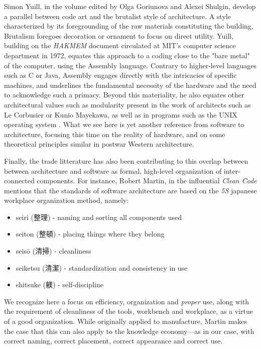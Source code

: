 Simon Yuill, in the volume edited by Olga Goriunova and Alexei Shulgin, develop a parallel between code art and the brutalist style of architecture. A style characterized by its foregrounding of the raw materials constituting the building, Brutalism foregoes decoration or ornament to focus on direct utility. Yuill, building on the \emph{HAKMEM} document circulated at MIT's computer science department in 1972, equates this approach to a coding close to the "bare metal" of the computer, using the Assembly language. Contrary to higher-level languages such as C or Java, Assembly engages directly with the intricacies of specific machines, and underlines the fundamental necessity of the hardware and the need to acknowledge such a primacy. Beyond this materiality, he also equates other architectural values such as modularity present in the work of architects such as Le Corbusier or Kunio Mayekawa, as well as in programs such as the UNIX operating system \citep{yuill_code_2004}. What we see here is yet another reference from software to architecture, focusing this time on the reality of hardware, and on some theoretical principles similar in postwar Western architecture.

Finally, the trade litterature has also been contributing to this overlap between between architecture and software as formal, high-level organization of inter-connected components. For instance, Robert Martin, in the influential \emph{Clean Code} mentions that the standards of software architecture are based on the \emph{5S} japanese workplace organization method, namely:

\begin{itemize}
  \item seiri (整理) - naming and sorting all components used
  \item seiton (整頓) - placing things where they belong
  \item seisō (清掃) - cleanliness
  \item seiketsu (清潔) - standardization and consistency in use
  \item shitsuke (躾) - self-discipline
\end{itemize}

We recognize here a focus on efficiency, organization and \emph{proper} use, along with the requirement of cleanliness of the tools, workbench and workplace, as a virtue of a good organization. While originally applied to manufacture, Martin makes the case that this can also apply to the knowledge economy—as in our case, with correct naming, correct placement, correct appearance and correct use.

